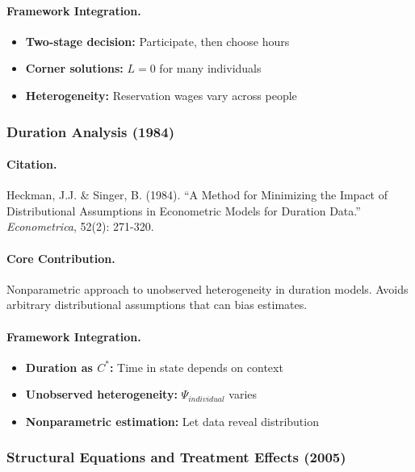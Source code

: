 \documentclass[12pt,a4paper]{article}
\begin{document}
\paragraph{Framework Integration.}
\begin{itemize}
  \item \textbf{Two-stage decision:} Participate, then choose hours
  \item \textbf{Corner solutions:} $L = 0$ for many individuals
  \item \textbf{Heterogeneity:} Reservation wages vary across people
\end{itemize}

\subsubsection{Duration Analysis (1984)}

\paragraph{Citation.}
Heckman, J.J. \& Singer, B. (1984). ``A Method for Minimizing the Impact
of Distributional Assumptions in Econometric Models for Duration Data.''
\emph{Econometrica}, 52(2): 271-320.

\paragraph{Core Contribution.}
Nonparametric approach to unobserved heterogeneity in duration models.
Avoids arbitrary distributional assumptions that can bias estimates.

\paragraph{Framework Integration.}
\begin{itemize}
  \item \textbf{Duration as $C^*$:} Time in state depends on context
  \item \textbf{Unobserved heterogeneity:} $\Psi_{individual}$ varies
  \item \textbf{Nonparametric estimation:} Let data reveal distribution
\end{itemize}

\subsubsection{Structural Equations and Treatment Effects (2005)}
\end{document}
